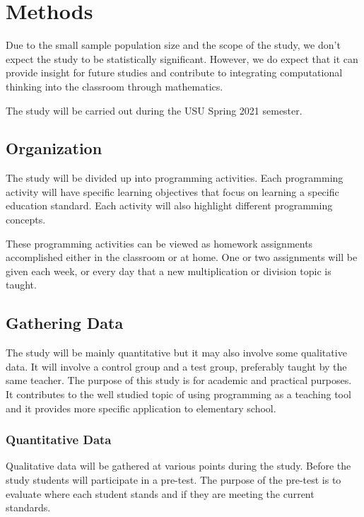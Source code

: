 \section{Methods}
Due to the small sample population size and the scope of the study, we don't expect the study to be statistically significant. However, we do expect that it can provide insight for future studies and contribute to integrating computational thinking into the classroom through mathematics.

The study will be carried out during the USU Spring 2021 semester.

\subsection*{Organization}

The study will be divided up into programming activities. Each programming activity will have specific learning objectives that focus on learning a specific education standard. Each activity will also highlight different programming concepts.%

These programming activities can be viewed as homework assignments accomplished either in the classroom or at home. 
One or two assignments will be given each week, or every day that a new multiplication or division topic is taught.

\subsection*{Gathering Data}
    The study will be mainly quantitative but it may also involve some qualitative data. 
    It will involve a control group and a test group, preferably taught by the same teacher. %
    The purpose of this study is for academic and practical purposes. It contributes to the well studied topic of using programming as a teaching tool and it provides more specific application to elementary school.

    \subsubsection*{Quantitative Data}
    Qualitative data will be gathered at various points during the study. 
    Before the study students will participate in a pre-test. The purpose of the pre-test is to evaluate where each student stands and if they are meeting the current standards.

